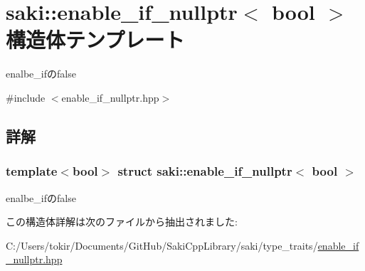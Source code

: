 \hypertarget{structsaki_1_1enable__if__nullptr}{}\section{saki\+:\+:enable\+\_\+if\+\_\+nullptr$<$ bool $>$ 構造体テンプレート}
\label{structsaki_1_1enable__if__nullptr}


enalbe\+\_\+ifのfalse  




{\ttfamily \#include $<$enable\+\_\+if\+\_\+nullptr.\+hpp$>$}



\subsection{詳解}
\subsubsection*{template$<$bool$>$\newline
struct saki\+::enable\+\_\+if\+\_\+nullptr$<$ bool $>$}

enalbe\+\_\+ifのfalse 

この構造体詳解は次のファイルから抽出されました\+:\begin{DoxyCompactItemize}
\item 
C\+:/\+Users/tokir/\+Documents/\+Git\+Hub/\+Saki\+Cpp\+Library/saki/type\+\_\+traits/\mbox{\hyperlink{enable__if__nullptr_8hpp}{enable\+\_\+if\+\_\+nullptr.\+hpp}}\end{DoxyCompactItemize}
